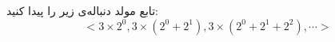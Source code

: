\p
تابع مولد دنباله‌ی زیر را پیدا کنید:
$$< 3\times2^0, 3\times(2^0 + 2^1), 3\times(2^0 + 2^1 + 2^2), \cdots >$$